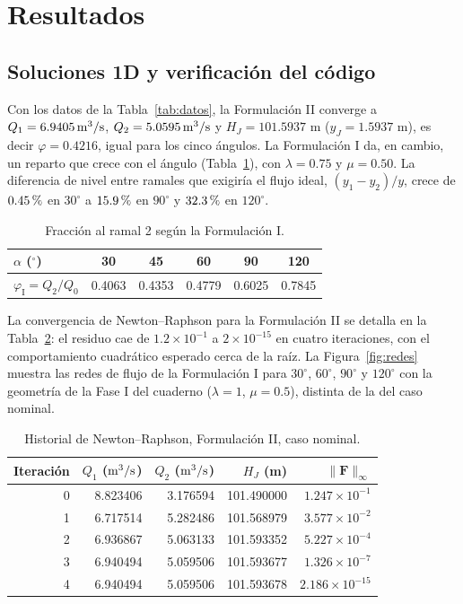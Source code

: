 \section{Resultados}\label{sec:resultados}
\subsection{Soluciones 1D y verificación del código}
Con los datos de la Tabla~\ref{tab:datos}, la Formulación II converge a $Q_1=6.9405\,\mathrm{m^3/s}$, $Q_2=5.0595\,\mathrm{m^3/s}$ y $H_J=101.5937$ m ($y_J=1.5937$ m), es decir $\varphi=0.4216$, igual para los cinco ángulos. La Formulación I da, en cambio, un reparto que crece con el ángulo (Tabla~\ref{tab:f1}), con $\lambda=0.75$ y $\mu=0.50$. La diferencia de nivel entre ramales que exigiría el flujo ideal, $(y_1-y_2)/y$, crece de $0.45\text{\thinspace\%}$ en $30^\circ$ a $15.9\text{\thinspace\%}$ en $90^\circ$ y $32.3\text{\thinspace\%}$ en $120^\circ$.

\begin{table}[H]
\centering\small
\caption{Fracción al ramal 2 según la Formulación I.}\label{tab:f1}
\begin{tabular}{lccccc}
\toprule
$\alpha$ ($^\circ$) & 30 & 45 & 60 & 90 & 120\\\midrule
$\varphi_{\mathrm I}=Q_2/Q_0$ & 0.4063 & 0.4353 & 0.4779 & 0.6025 & 0.7845\\\bottomrule
\end{tabular}
\end{table}

La convergencia de Newton--Raphson para la Formulación II se detalla en la Tabla~\ref{tab:iter}: el residuo cae de $1.2\times10^{-1}$ a $2\times10^{-15}$ en cuatro iteraciones, con el comportamiento cuadrático esperado cerca de la raíz. La Figura~\ref{fig:redes} muestra las redes de flujo de la Formulación I para $30^\circ$, $60^\circ$, $90^\circ$ y $120^\circ$ con la geometría de la Fase I del cuaderno ($\lambda=1$, $\mu=0.5$), distinta de la del caso nominal.

\begin{table}[H]
\centering\small
\caption{Historial de Newton--Raphson, Formulación II, caso nominal.}\label{tab:iter}
\begin{tabular}{rrrrr}
\toprule
Iteración & $Q_1$ ($\mathrm{m^3/s}$) & $Q_2$ ($\mathrm{m^3/s}$) & $H_J$ (m) & $\|\mathbf F\|_\infty$\\\midrule
0 & 8.823406 & 3.176594 & 101.490000 & $1.247\times10^{-1}$\\
1 & 6.717514 & 5.282486 & 101.568979 & $3.577\times10^{-2}$\\
2 & 6.936867 & 5.063133 & 101.593352 & $5.227\times10^{-4}$\\
3 & 6.940494 & 5.059506 & 101.593677 & $1.326\times10^{-7}$\\
4 & 6.940494 & 5.059506 & 101.593678 & $2.186\times10^{-15}$\\\bottomrule
\end{tabular}
\end{table}

